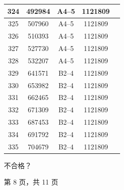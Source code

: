 \documentclass[UTF8,10pt,a4paper,fontset=fandol]{ctexart}
\newcommand{\fieldvalue}[1]{#1}
\newcommand{\handwritten}[1]{#1}
\begin{document}
\begin{center}
\begin{tabular}{|c|c|c|c|p{3.0cm}|}
\hline
324 & 492984 & A4--5 & 1121809 & \\
\hline
325 & 507960 & A4--5 & 1121809 & \\
\hline
326 & 510393 & A4--5 & 1121809 & \\
\hline
327 & 527730 & A4--5 & 1121809 & \\
\hline
328 & 532207 & A4--5 & 1121809 & \\
\hline
329 & 641571 & B2--4 & 1121809 & \\
\hline
330 & 653982 & B2--4 & 1121809 & \\
\hline
331 & 662465 & B2--4 & 1121809 & \\
\hline
332 & 671309 & B2--4 & 1121809 & \\
\hline
333 & 687453 & B2--4 & 1121809 & \\
\hline
334 & 691792 & B2--4 & 1121809 & \\
\hline
335 & 704679 & B2--4 & 1121809 & \\
\hline
\end{tabular}

\vspace{1em}

\fieldvalue{\handwritten{不合格？}}

\end{center}

\begin{center}
第 8 页，共 11 页
\end{center}

\newpage
\end{document}

